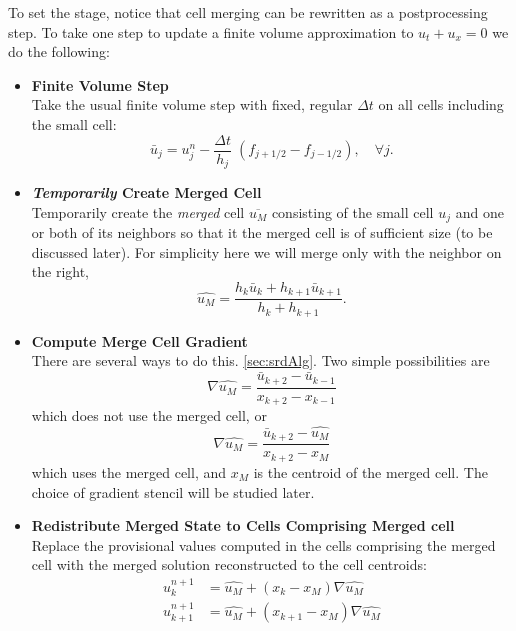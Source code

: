 To set the stage, notice that cell merging can
be rewritten as a postprocessing step.
To take one step to update a finite volume approximation to
$u_t + u_x = 0$ we do the following:
\begin{itemize}
\setlength\itemsep{.2in}
\item
{\bf Finite Volume Step}\\
Take the usual finite volume step with fixed, regular  $\Delta t$ on all cells 
including the small cell:
\begin{equation}
\bar{u}_j = u_j^n - \frac{\Delta t}{h_j} \; (f_{j+1/2} - f_{j-1/2} ), 
\quad \forall j.
\label{eqn:fvupdate}
\end{equation}

\item
{\bf {\em Temporarily} Create Merged Cell}\\
Temporarily create the {\em merged} cell $\overline{u_M}$ consisting of the small cell $u_j$ and one
or both of its neighbors so that it the merged cell is of sufficient
size (to be discussed later).  For simplicity here we will merge 
only with the neighbor on the right,
\begin{equation}
\widehat{u_M} =  \frac{ h_k \bar{u}_k + h_{k+1} \bar{u}_{k+1} } {h_k +
h_{k+1}} .
\label{eqn:mergestep}
\end{equation}

\item
{\bf Compute Merge Cell Gradient }\\
There are several ways to do this. 
\ref{sec:srdAlg}.
Two simple possibilities are 
\begin{equation}
\nabla \widehat{u_M} = \frac{\bar{u}_{k+2} - \bar{u}_{k-1}} {x_{k+2}-x_{k-1}}
\label{eqn:gradLim1}
\end{equation}
which does not use the merged cell,
or
\begin{equation}
\nabla \widehat{u_M} = \frac{\bar{u}_{k+2} - \widehat{u_{M}}} {x_{k+2}-x_{M}}
\label{eqn:gradLim2}
\end{equation}
which uses the merged cell, and $x_M$ is the centroid of the merged
cell.
The choice of gradient stencil will be studied later. 


\item
{\bf Redistribute Merged State to Cells Comprising Merged cell }\\
Replace the provisional values computed in the cells comprising the
merged cell with the merged solution reconstructed to the cell
centroids:
\begin{equation}
\begin{split}
u_k^{n+1} &= \widehat{u_M} +  (x_k - x_M) \nabla \widehat{u_M}\\
u_{k+1}^{n+1} &= \widehat{u_M} +  (x_{k+1} - x_M) \nabla \widehat{u_M}
\end{split}
\end{equation}
\end{itemize}
